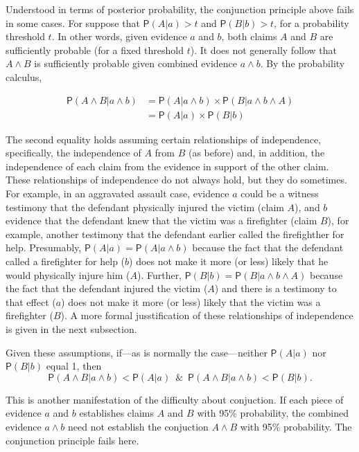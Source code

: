 \documentclass[10pt,dvipsnames,enabledeprecatedfontcommands]{scrartcl}
\newcommand{\et}{\wedge}
\newcommand{\pr}[1]{\mathsf{P}(#1)}
\begin{document}
Understood in terms of posterior probability, the conjunction principle
above fails in some cases. For suppose that \(\pr{A | a}>t\) and
\(\pr{B | b}>t\), for a probability threshold \(t\). In other words,
given evidence \(a\) and \(b\), both claims \(A\) and \(B\) are
sufficiently probable (for a fixed threshold \(t\)). It does not
generally follow that \(A \et B\) is sufficiently probable given
combined evidence \(a\et b\). By the probability calculus,

\begin{align*}
\pr{A \wedge  B | a \wedge b}& =\pr{A |a \wedge b} \times \pr{B | a \wedge b \wedge A}\\
 & = \pr{A |a} \times \pr{B | b}
 \end{align*}

\noindent
{} The second
equality holds assuming certain relationships of independence,
specifically, the independence of \(A\) from \(B\) (as before) and, in
addition, the independence of each claim from the evidence in support of
the other claim. These relationships of independence do not always hold,
but they do sometimes. For example, in an aggravated assault case,
evidence \(a\) could be a witness testimony that the defendant
physically injured the victim (claim \(A\)), and \(b\) evidence that the
defendant knew that the victim was a firefighter (claim \(B\)), for
example, another testimony that the defendant earlier called the
firefighther for help. Presumably,
\(\pr{A \vert a}=\pr{A \vert a \wedge b}\) because the fact that the
defendant called a firefighter for help (\(b\)) does not make it more
(or less) likely that he would physically injure him (\(A\)). Further,
\(\pr{B \vert b}=\pr{B \vert a \wedge b \wedge A}\) because the fact
that the defendant injured the victim (\(A\)) and there is a testimony
to that effect (\(a\)) does not make it more (or less) likely that the
victim was a firefighter (\(B\)). A more formal jusstification of these
relationships of independence is given in the next subsection.

Given these assumptions, if---as is normally the case---neither
\(\pr{A \vert a}\) nor \(\pr{B \vert b}\) equal 1, then
\[\pr{A \wedge B \vert a \wedge b}< \pr{A \vert a} \;\ \& \;\ \pr{A \wedge B \vert a \wedge b} < \pr{B \vert b}. \]

\noindent
This is another manifestation of the difficulty about conjuction. If
each piece of evidence \(a\) and \(b\) establishes claims \(A\) and
\(B\) with 95\% probability, the combined evidence \(a\et b\) need not
establish the conjuction \(A\et B\) with 95\% probability. The
conjunction principle fails here.
\end{document}
